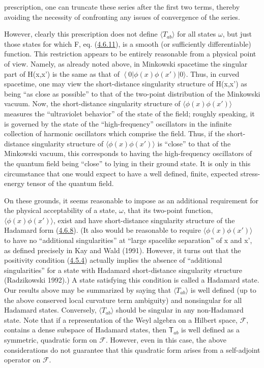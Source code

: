 \documentclass[11pt,a4paper]{article}
\providecommand{\bra}[1]{\left\langle#1\right\rvert}
\begin{document}
prescription, one can truncate these series after the first two terms, thereby avoiding the necessity of confronting any issues of convergence of the series.

However, clearly this prescription does not define \(\langle T_{ab}\rangle\) for all states \(\omega\), but just those states for which F, eq. (\hyperref[eq:4.6.11]{4.6.11}), is a smooth (or sufficiently differentiable) function. This restriction appears to be entirely reasonable from a physical point of view. Namely, as already noted above, in Minkowski spacetime the singular part of H(x,x') is the same as that of \(\bra0 \phi(x)\phi(x')\lvert 0\rangle \). Thus, in curved spacetime, one may view the short-distance singularity structure of H(x,x') as being ``as close as possible'' to that of the two-point distribution of the Minkowski vacuum. Now, the short-distance singularity structure of \(\langle \phi(x)\phi(x') \rangle\) measures the ``ultraviolet behavior'' of the state of the field; roughly speaking, it is governed by the state of the ``high-frequency'' oscillators in the infinite collection of harmonic oscillators which comprise the field. Thus, if the short-distance singularity structure of \(\langle \phi(x) \phi(x') \rangle\) is ``close'' to that of the Minkowski vacuum, this corresponds to having the high-frequency oscillators of the quantum field being ``close'' to lying in their ground state. It is only in this circumstance that one would expect to have a well defined, finite, expected stress-energy tensor of the quantum field.

On these grounds, it seems reasonable to impose as an additional requirement for the physical acceptability of a state, \(\omega\), that its two-point function, \(\langle \phi(x)\phi(x') \rangle\), exist and have short-distance singularity\hypertarget{source-108}{} structure of the Hadamard form (\hyperref[eq:4.6.8]{4.6.8}). (It also would be reasonable to require \(\langle \phi(x)\phi(x') \rangle\) to have no ``additional singularities'' at ``large spacelike separation'' of x and x', as defined precisely in Kay and Wald (1991). However, it turns out that the positivity condition (\hyperref[eq:4.5.4]{4.5.4}) actually implies the absence of ``additional singularities'' for a state with Hadamard short-distance singularity structure (Radzikowski 1992).) A state satisfying this condition is called a Hadamard state. Our results above may be summarized by saying that \(\langle T_{ab}\rangle\) is well defined (up to the above conserved local curvature term ambiguity) and nonsingular for all Hadamard states. Conversely, \(\langle T_{ab}\rangle\) should be singular in any non-Hadamard state. Note that if a representation of the Weyl algebra on a Hilbert space, \({\mathcal{F}}\), contains a dense subspace of Hadamard states, then \({\mathsf T}_{ab}\) is well defined as a symmetric, quadratic form on \(\mathcal F\). However, even in this case, the above considerations do not guarantee that this quadratic form arises from a self-adjoint operator on \(\mathcal F\).
\end{document}
